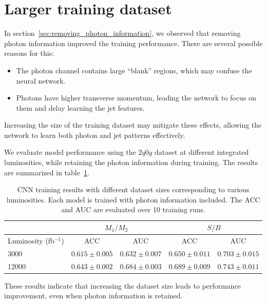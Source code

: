 \documentclass[12pt]{article}
\begin{document}

\section{Larger training dataset}%
\label{sec:larger_training_dataset}
    In section~\ref{sec:removing_photon_information}, we observed that removing photon information improved the training performance. There are several possible reasons for this:
    \begin{itemize}
        \item The photon channel contains large ``blank'' regions, which may confuse the neural network.
        \item Photons have higher transverse momentum, leading the network to focus on them and delay learning the jet features.
    \end{itemize}
    Increasing the size of the training dataset may mitigate these effects, allowing the network to learn both photon and jet patterns effectively.

    We evaluate model performance using the $2q0g$ dataset at different integrated luminosities, while retaining the photon information during training. The results are summarized in table~\ref{tab:CWoLa_CNN_training_results_3000_jet_tagging_L_3000_12000}.
    \begin{table}[htpb]
        \centering
        \caption{CNN training results with different dataset sizes corresponding to various luminosities. Each model is trained with photon information included. The ACC and AUC are evaluated over 10 training runs.}
        \label{tab:CWoLa_CNN_training_results_3000_jet_tagging_L_3000_12000}
        \begin{tabular}{l|cc|cc}
                                    & \multicolumn{2}{c|}{$M_1 / M_2$}      & \multicolumn{2}{c}{$S / B$}           \\ \hline
            Luminosity (fb$^{-1}$)  & ACC               & AUC               & ACC               & AUC               \\ \hline
            3000                    & $0.615 \pm 0.005$ & $0.632 \pm 0.007$ & $0.650 \pm 0.011$ & $0.703 \pm 0.015$ \\
            12000                   & $0.643 \pm 0.002$ & $0.684 \pm 0.003$ & $0.689 \pm 0.009$ & $0.743 \pm 0.011$
        \end{tabular}
    \end{table}
    These results indicate that increasing the dataset size leads to performance improvement, even when photon information is retained.
\end{document}
